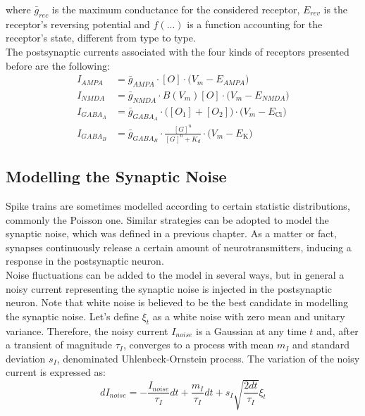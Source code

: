 where \(\bar{g}_{rec}\) is the maximum conductance for the considered receptor,
\(E_{rev}\) is the receptor's reversing potential and \(f(...)\) is a function
accounting for the receptor's state, different from type to type.\\
The postsynaptic currents associated with the four kinds of receptors
presented before are the following:
\begin{align*}
    I_{AMPA}     & =\bar{g}_{AMPA}\cdot{[O]}\cdot{\bigl(V_{m}-E_{AMPA}\bigr)}                                   \\
    I_{NMDA}     & =\bar{g}_{NMDA}\cdot{B(V_{m})[O]}\cdot{\bigl(V_{m}-E_{NMDA}\bigr)}                           \\
    I_{GABA_{A}} & =\bar{g}_{GABA_{A}}\cdot{\bigl([O_{1}]+[O_{2}]\bigr)}\cdot{\bigl(V_{m}-E_{\text{Cl}}\bigr)}  \\
    I_{GABA_{B}} & =\bar{g}_{GABA_{B}}\cdot{\frac{[G]^{n}}{[G]^{n}+K_{d}}}\cdot{\bigl(V_{m}-E_{\text{K}}\bigr)}
\end{align*}

\subsection{Modelling the Synaptic Noise}
Spike trains are sometimes modelled according to certain statistic distributions,
commonly the Poisson one. Similar strategies can be adopted to model the
synaptic noise, which was defined in a previous chapter. As a matter or fact, synapses
continuously release a certain amount of neurotransmitters, inducing a response
in the postsynaptic neuron.\\
Noise fluctuations can be added to the model in several ways, but in general a
noisy current representing the synaptic noise is injected in the
postsynaptic neuron. Note that white noise is believed to be the best
candidate in modelling the synaptic noise. Let's define \(\xi_{t}\) as
a white noise with zero mean and unitary variance. Therefore, the noisy
current \(I_{noise}\) is a Gaussian at any time \(t\) and, after a
transient of magnitude \(\tau_{I}\), converges to a process with mean \(m_{I}\)
and standard deviation \(s_{I}\), denominated Uhlenbeck-Ornstein process.
The variation of the noisy current is expressed as:
\begin{equation*}
    dI_{noise}=-\frac{I_{noise}}{\tau_{I}}dt+\frac{m_{I}}{\tau_{I}}dt+s_{I}\sqrt{\frac{2dt}{\tau_{I}}}\xi_{t}
\end{equation*}

